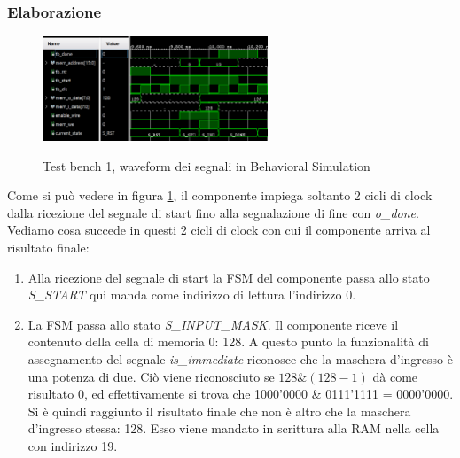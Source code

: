 \documentclass{article}
\begin{document}
\subsubsection{Elaborazione}
\begin{figure}[H]
    \centering
    \caption{Test bench 1, waveform dei segnali in Behavioral Simulation}
    \includegraphics[width=0.6\textwidth]{images/test-bench-1.png}
    \label{fig:test-bench-1}
\end{figure}
Come si può vedere in figura \ref{fig:test-bench-1}, il componente impiega soltanto 2 cicli di clock dalla ricezione del segnale di start fino alla segnalazione di fine con \textit{o\_done}.\\
Vediamo cosa succede in questi 2 cicli di clock con cui il componente arriva al risultato finale:
\renewcommand{\labelenumi}{\Roman{enumi}}
\begin{enumerate}
    \item Alla ricezione del segnale di start la FSM del componente passa allo stato \textit{S\_START} qui manda come indirizzo di lettura l'indirizzo 0.
    \item La FSM passa allo stato \textit{S\_INPUT\_MASK}. Il componente riceve il contenuto della cella di memoria 0: 128. A questo punto la funzionalità di assegnamento del segnale \textit{is\_immediate} riconosce che la maschera d'ingresso è una potenza di due. Ciò viene riconosciuto se \(128\&(128-1)\) dà come risultato 0, ed effettivamente si trova che 1000'0000 \& 0111'1111 = 0000'0000. Si è quindi raggiunto il risultato finale che non è altro che la maschera d'ingresso stessa: 128.  Esso viene mandato in scrittura alla RAM nella cella con indirizzo 19.
\end{enumerate}
\end{document}
